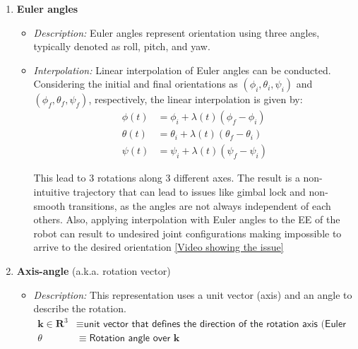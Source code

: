 \documentclass[10pt, aspectratio=169]{beamer}
\theoremstyle{remark}
\theoremstyle{definition}
\begin{document}
\begin{frame}[allowframebreaks]
\begin{enumerate}
    \framebreak
    
    \item \textbf{Euler angles}
    \begin{itemize}
        \item \textit{Description:} Euler angles represent orientation using three angles, typically denoted as roll, pitch, and yaw.
        
        \item \textit{Interpolation:} Linear interpolation of Euler angles can be conducted. Considering the initial and final orientations as $(\phi_i, \theta_i, \psi_i)$ and  $(\phi_f, \theta_f, \psi_f)$, respectively, the linear interpolation is given by:
        \begin{equation*}
            \begin{split}
            \phi(t) & = \phi_i + \lambda(t) (\phi_f-\phi_i)\\
            \theta(t) & = \theta_i + \lambda(t) (\theta_f-\theta_i)\\
            \psi(t) & = \psi_i + \lambda(t) (\psi_f-\psi_i)
            \end{split}
        \end{equation*}
        
        This lead to 3 rotations along 3 different axes. The result is a non-intuitive trajectory that can lead to issues like gimbal lock and non-smooth transitions, as the angles are not always independent of each others. Also, applying interpolation with Euler angles to the EE of the robot can result to undesired joint configurations making impossible to arrive to the desired orientation \href{https://eii.cv.uma.es/mod/resource/view.php?id=588131}{[Video showing the issue]}
    \end{itemize}

    \framebreak
    
    \item \textbf{Axis-angle} (a.k.a. rotation vector)~\cite{cartesian_trajectory_planning, lynch2017modern}
    \begin{itemize}
        \item  \textit{Description:} This representation uses a unit vector (axis) and an angle to describe the rotation.
        \begin{equation*}
            \begin{split}
            \mathbf{k}\in\mathbf{R}^3 & \equiv \textsf{unit vector that defines the direction of the rotation axis (Euler axis)}\\
            \theta & \equiv \textsf{Rotation angle over } \mathbf{k}
            \end{split}
        \end{equation*}


\end{itemize}
\end{enumerate}
\end{frame}
\end{document}
